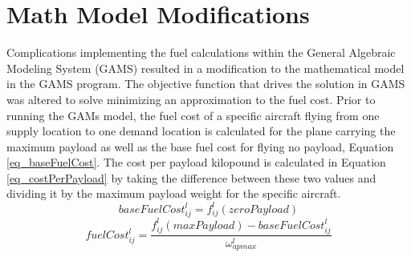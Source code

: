 \section{Math Model Modifications} \label{sec_mathModelMod}
Complications implementing the fuel calculations within the General Algebraic Modeling System (GAMS) resulted in a modification to the mathematical model in the GAMS program. The objective function that drives the solution in GAMS was altered to solve minimizing an approximation to the fuel cost. Prior to running the GAMs model, the fuel cost of a specific aircraft flying from one supply location to one demand location is calculated for the plane carrying the maximum payload as well as the base fuel cost for flying no payload, Equation \ref{eq_baseFuelCost}. The cost per payload kilopound is calculated in Equation \ref{eq_costPerPayload} by taking the difference between these two values and dividing it by the maximum payload weight for the specific aircraft.
\begin{equation}
\label{eq_baseFuelCost}
baseFuelCost_{ij}^l=f_{ij}^l(zeroPayload)
\end{equation}
\begin{equation}
\label{eq_costPerPayload}
fuelCost_{ij}^l=\frac{f_{ij}^l(maxPayload)-baseFuelCost_{ij}^l}{\omega_{apmax}^l}
\end{equation}

